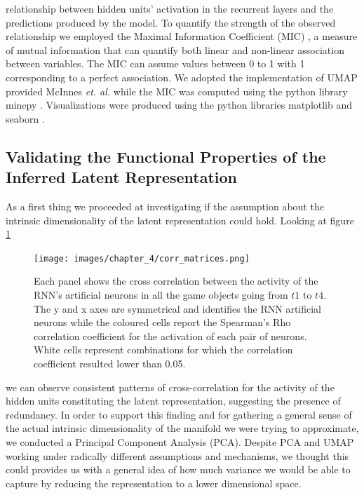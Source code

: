 relationship between hidden units' activation in the recurrent layers and the predictions produced by the model. To quantify the strength of the observed relationship we employed the Maximal Information Coefficient (MIC) \cite{reshef2011detecting}, a measure of mutual information that can quantify both linear and non-linear association between variables. The MIC can assume values between 0 to 1 with 1 corresponding to a perfect association. We adopted the implementation of UMAP provided McInnes \textit{et. al.} \cite{mcinnes2018umap-software} while the MIC was computed using the python library minepy \cite{albanese2013minerva}. Visualizations were produced using the python libraries matplotlib \cite{hunter2007matplotlib} and seaborn \cite{waskom2021seaborn}.

\subsection{Validating the Functional Properties of the Inferred Latent Representation}
\label{functional_properties}
As a first thing we proceeded at investigating if the assumption about the intrinsic dimensionality of the latent representation could hold. Looking at figure \ref{cross_corr_act}
\begin{figure}[h]
\centering
\texttt{[image: images/chapter\_4/corr\_matrices.png]}
\caption[\textbf{Cross-correlation analysis of the hidden units activation of the RNN architecture}]{Each panel shows the cross correlation between the activity of the RNN's artificial neurons in all the game objects going from $t1$ to $t4$. The y and x axes are symmetrical and identifies the RNN artificial neurons while the coloured cells report the Spearman's Rho correlation coefficient for the activation of each pair of neurons. White cells represent combinations for which the correlation coefficient resulted lower than 0.05.}
\label{cross_corr_act} 
\end{figure}
we can observe consistent patterns of cross-correlation for the activity of the hidden units constituting the latent representation, suggesting the presence of redundancy. In order to support this finding and for gathering a general sense of the actual intrinsic dimensionality of the manifold we were trying to approximate, we  conducted a Principal Component Analysis (PCA). Despite PCA and UMAP working under radically different assumptions and mechanisms, we thought this could provides us with a general idea of how much variance we would be able to capture by reducing the representation to a lower dimensional space. 
